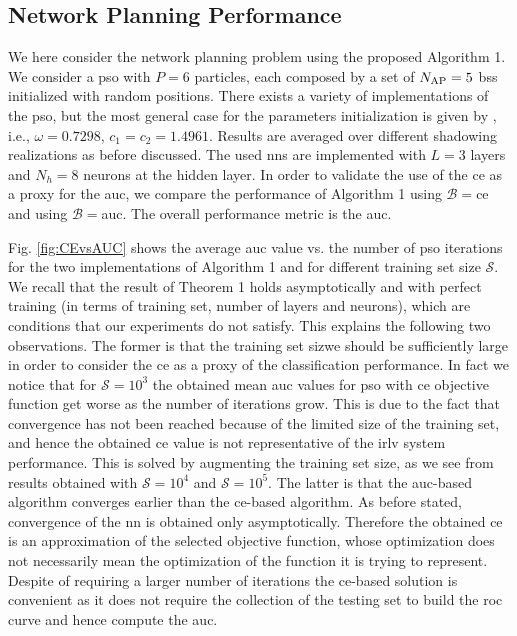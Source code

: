 \documentclass[conference,final]{IEEEtran}
\begin{document}
\subsection{Network Planning Performance}

We here consider the network planning problem using the proposed Algorithm 1. We consider a \ac{pso} with $P=6$ particles, each composed by a set of $N_{\rm AP}=5$ \acp{bs} initialized with random positions. There exists a variety of implementations of the \ac{pso}, but the most general case for the parameters initialization is given by \cite{clerc2002}, i.e.,   $\omega=0.7298$, $c_1=c_2=1.4961$. Results are averaged over different shadowing realizations as before discussed. The used \acp{nn} are implemented with $L=3$ layers and $N_h=8$ neurons at the hidden layer. In order to validate the use of the \ac{ce} as a proxy for the \ac{auc}, we compare the performance of Algorithm 1 using $\mathcal{B}=$\ac{ce} and using $\mathcal{B}=$\ac{auc}. The overall performance metric is the \ac{auc}.

Fig. \ref{fig:CEvsAUC} shows the average \ac{auc} value vs. the number of \ac{pso} iterations for the two implementations of Algorithm 1 and for different training set size $\mathcal{S}$.
We recall that the result of Theorem 1 holds asymptotically and with perfect training (in terms of training set, number of layers and neurons), which are conditions that our experiments do not satisfy. This explains the following two observations. The former is that the training set sizwe should be sufficiently large in order to consider the \ac{ce} as a proxy of the classification performance. In fact we notice that for $\mathcal{S}=10^3$ the obtained mean \ac{auc} values for \ac{pso} with \ac{ce} objective function get worse as the  number of iterations grow. This is due to the fact that convergence has not been reached because of the limited size of the training set, and hence the obtained \ac{ce} value is not representative of the \ac{irlv} system performance. This is solved by augmenting the training set size, as we see from results obtained with $\mathcal{S}=10^4$ and $\mathcal{S}=10^5$. The latter is that the \ac{auc}-based algorithm converges earlier than the \ac{ce}-based algorithm. As before stated, convergence of the \ac{nn} is obtained only asymptotically. Therefore the obtained \ac{ce} is an approximation of the selected objective function, whose optimization does not necessarily mean the optimization of the function it is trying to represent. Despite of requiring a larger number of iterations the \ac{ce}-based solution is convenient as it does not require the collection of the testing set to build the \ac{roc} curve and hence compute the \ac{auc}.   
\end{document}
